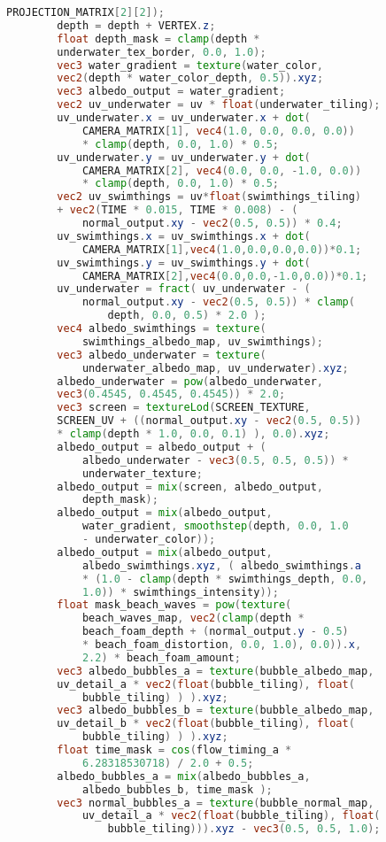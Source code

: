 \begin{lstlisting}[language=GLSL, caption={\label{cf:agua} \textit{Shader} de efeito de água na Unity}]
		PROJECTION_MATRIX[2][2]); 
		depth = depth + VERTEX.z;
		float depth_mask = clamp(depth * 
		underwater_tex_border, 0.0, 1.0);
		vec3 water_gradient = texture(water_color, 
		vec2(depth * water_color_depth, 0.5)).xyz;
		vec3 albedo_output = water_gradient;
		vec2 uv_underwater = uv * float(underwater_tiling);
		uv_underwater.x = uv_underwater.x + dot(
			CAMERA_MATRIX[1], vec4(1.0, 0.0, 0.0, 0.0)) 
			* clamp(depth, 0.0, 1.0) * 0.5;
		uv_underwater.y = uv_underwater.y + dot(
			CAMERA_MATRIX[2], vec4(0.0, 0.0, -1.0, 0.0)) 
			* clamp(depth, 0.0, 1.0) * 0.5;
		vec2 uv_swimthings = uv*float(swimthings_tiling) 
		+ vec2(TIME * 0.015, TIME * 0.008) - (
			normal_output.xy - vec2(0.5, 0.5)) * 0.4;
		uv_swimthings.x = uv_swimthings.x + dot(
			CAMERA_MATRIX[1],vec4(1.0,0.0,0.0,0.0))*0.1;
		uv_swimthings.y = uv_swimthings.y + dot(
			CAMERA_MATRIX[2],vec4(0.0,0.0,-1.0,0.0))*0.1;
		uv_underwater = fract( uv_underwater - (
			normal_output.xy - vec2(0.5, 0.5)) * clamp(
				depth, 0.0, 0.5) * 2.0 );
		vec4 albedo_swimthings = texture(
			swimthings_albedo_map, uv_swimthings);
		vec3 albedo_underwater = texture(
			underwater_albedo_map, uv_underwater).xyz;
		albedo_underwater = pow(albedo_underwater, 
		vec3(0.4545, 0.4545, 0.4545)) * 2.0;
		vec3 screen = textureLod(SCREEN_TEXTURE, 
		SCREEN_UV + ((normal_output.xy - vec2(0.5, 0.5)) 
		* clamp(depth * 1.0, 0.0, 0.1) ), 0.0).xyz; 
		albedo_output = albedo_output + (
			albedo_underwater - vec3(0.5, 0.5, 0.5)) * 
			underwater_texture;
		albedo_output = mix(screen, albedo_output, 
			depth_mask);
		albedo_output = mix(albedo_output, 
			water_gradient, smoothstep(depth, 0.0, 1.0 
			- underwater_color));
		albedo_output = mix(albedo_output, 
			albedo_swimthings.xyz, ( albedo_swimthings.a 
			* (1.0 - clamp(depth * swimthings_depth, 0.0, 
			1.0)) * swimthings_intensity));
		float mask_beach_waves = pow(texture(
			beach_waves_map, vec2(clamp(depth * 
			beach_foam_depth + (normal_output.y - 0.5) 
			* beach_foam_distortion, 0.0, 1.0), 0.0)).x, 
			2.2) * beach_foam_amount;
		vec3 albedo_bubbles_a = texture(bubble_albedo_map, 
		uv_detail_a * vec2(float(bubble_tiling), float(
			bubble_tiling) ) ).xyz;
		vec3 albedo_bubbles_b = texture(bubble_albedo_map, 
		uv_detail_b * vec2(float(bubble_tiling), float(
			bubble_tiling) ) ).xyz;
		float time_mask = cos(flow_timing_a * 
			6.28318530718) / 2.0 + 0.5;
		albedo_bubbles_a = mix(albedo_bubbles_a, 
			albedo_bubbles_b, time_mask );
		vec3 normal_bubbles_a = texture(bubble_normal_map, 
			uv_detail_a * vec2(float(bubble_tiling), float(
				bubble_tiling))).xyz - vec3(0.5, 0.5, 1.0);

\end{lstlisting}
